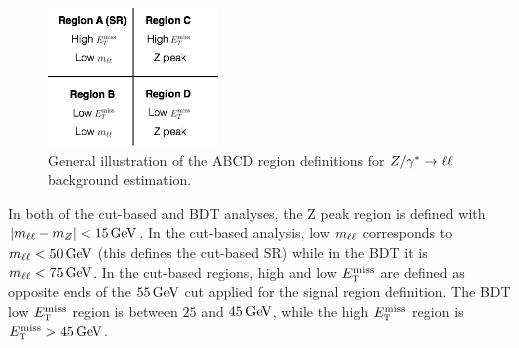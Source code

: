 
\begin{figure}[h!]
  \centering
  \captionsetup{justification=centering}
  \includegraphics[width=0.4\textwidth]{figures/ABCD}
  \caption{General illustration of the ABCD region definitions for $Z/\gamma^{\ast}\to\ell\ell$ background estimation.}
  \label{fig:ABCDcuts}
\end{figure}

In both of the cut-based and BDT analyses, the Z peak region is defined with $|\mll - m_Z| < 15 \GeV$. In the cut-based analysis, low $m_{\ell\ell}$ corresponds to $\mll < 50 \GeV$ (this defines the cut-based SR) while in the BDT it is $\mll < 75 \GeV$. In the cut-based regions, high and low $E_{\textrm{\footnotesize\sc t}}^{\rm miss}$ are defined as opposite ends of the $55 \GeV$ cut applied for the signal region definition. The BDT low $E_{\textrm{\footnotesize\sc t}}^{\rm miss}$ region is between $25$ and $45 \GeV$, while the high $E_{\textrm{\footnotesize\sc t}}^{\rm miss}$ region is $\MET > 45 \GeV$. 

